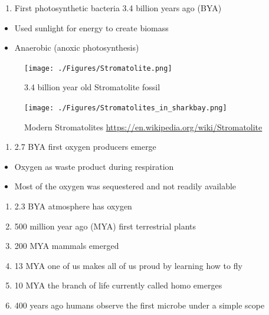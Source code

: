 \documentclass[
]{book}
\providecommand{\tightlist}{%
  \setlength{\itemsep}{0pt}\setlength{\parskip}{0pt}}
\begin{document}
\begin{enumerate}
\def\labelenumi{\arabic{enumi}.}
\setcounter{enumi}{1}
\tightlist
\item
  First photosynthetic bacteria 3.4 billion years ago (BYA)
\end{enumerate}

\begin{itemize}
\tightlist
\item
  Used sunlight for energy to create biomass
\item
  Anaerobic (anoxic photosynthesis)
\end{itemize}

\begin{figure}
\centering
\texttt{[image: ./Figures/Stromatolite.png]}
\caption{3.4 billion year old Stromatolite fossil}
\end{figure}

\begin{figure}
\centering
\texttt{[image: ./Figures/Stromatolites\_in\_sharkbay.png]}
\caption{Modern Stromatolites \url{https://en.wikipedia.org/wiki/Stromatolite}}
\end{figure}

\begin{enumerate}
\def\labelenumi{\arabic{enumi}.}
\setcounter{enumi}{2}
\tightlist
\item
  2.7 BYA first oxygen producers emerge
\end{enumerate}

\begin{itemize}
\tightlist
\item
  Oxygen as waste product during respiration
\item
  Most of the oxygen was sequestered and not readily available
\end{itemize}

\begin{enumerate}
\def\labelenumi{\arabic{enumi}.}
\setcounter{enumi}{3}
\tightlist
\item
  2.3 BYA atmosphere has oxygen
\item
  500 million year ago (MYA) first terrestrial plants
\item
  200 MYA mammals emerged
\item
  13 MYA one of us makes all of us proud by learning how to fly
\item
  10 MYA the branch of life currently called homo emerges
\item
  400 years ago humans observe the first microbe under
  a simple scope
\end{enumerate}
\end{document}
